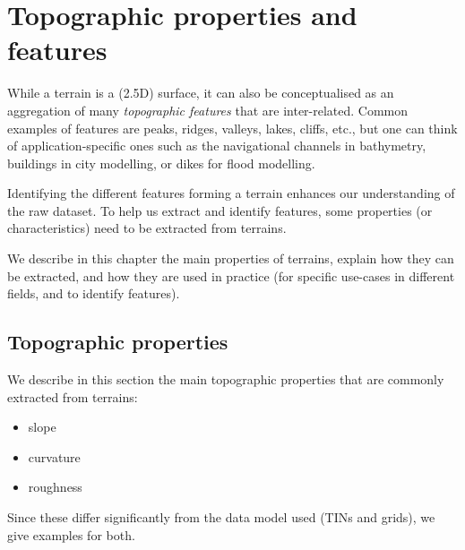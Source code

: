 
\graphicspath{{topofeatures/}}


\chapter{Topographic properties and features}%
\label{chap:topofeatures}

While a terrain is a (2.5D) surface, it can also be conceptualised as an aggregation of many \emph{topographic features} that are inter-related.%
Common examples of features are peaks, ridges, valleys, lakes, cliffs, etc., but one can think of application-specific ones such as the navigational channels in bathymetry, buildings in city modelling, or dikes for flood modelling.

Identifying the different features forming a terrain enhances our understanding of the raw dataset.
To help us extract and identify features, some properties (or characteristics) need to be extracted from terrains.

We describe in this chapter the main properties of terrains, explain how they can be extracted, and how they are used in practice (for specific use-cases in different fields, and to identify features).



%
\section{Topographic properties}%
\label{sec:topoproperties}

We describe in this section the main topographic properties that are commonly extracted from terrains:
\begin{itemize}
  \item slope
  \item curvature
  \item roughness
\end{itemize}

Since these differ significantly from the data model used (TINs and grids), we give examples for both.

